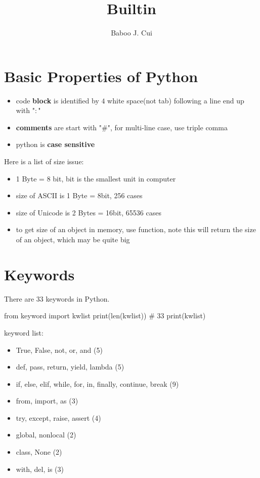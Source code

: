 \documentclass[10pt,a4paper,oneside]{article}
\author{Baboo J. Cui}
\title{Builtin}
\begin{document}
\maketitle
\tableofcontents

\newpage

\section{Basic Properties of Python}
\begin{itemize}
	\item code \textbf{block} is identified by $4$ white space(not tab) following a line end up with "$:$"
	\item \textbf{comments} are start with "$\#$", for multi-line case, use triple comma
	\item python is \textbf{case sensitive}
\end{itemize}
Here is a list of size issue:
\begin{itemize}
	\item 1 Byte = 8 bit, bit is the smallest unit in computer
	\item size of ASCII is 1 Byte = 8bit, 256 cases
	\item size of Unicode is 2 Bytes = 16bit, 65536 cases
	\item to get size of an object in memory, use  function, note this will return the size of an object, which may be quite big
\end{itemize}

\section{Keywords}
There are $33$ keywords in Python.
\begin{python}
	from keyword import kwlist
	print(len(kwlist))  # 33
	print(kwlist)       
\end{python}
keyword list:
\begin{itemize}
	\item True, False, not, or, and (5)
	\item def, pass, return, yield, lambda (5)
	\item if, else, elif, while, for, in, finally, continue, break (9)
	\item from, import, as (3)
	\item try, except, raise, assert (4)
	\item global, nonlocal (2)
	\item class, None (2)
	\item with, del, is (3)
\end{itemize}
\end{document}
